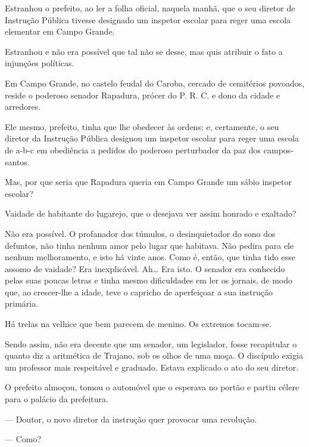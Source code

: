 
\noindent{}Estranhou o prefeito, ao ler a folha oficial, naquela manhã, que o seu
diretor de Instrução Pública tivesse designado um inspetor escolar para
reger uma escola elementar em Campo Grande.

Estranhou e não era possível que tal não se desse, mas quis atribuir o
fato a injunções políticas.

Em Campo Grande, no castelo feudal do Caroba, cercado de cemitérios
povoados, reside o poderoso senador Rapadura, prócer do P. R. C. e dono
da cidade e arredores.

Ele mesmo, prefeito, tinha que lhe obedecer às ordens; e, certamente, o
seu diretor da Instrução Pública designou um inspetor escolar para reger
uma escola de a-b-c em obediência a pedidos do poderoso perturbador da
paz dos campos-santos.

Mas, por que seria que Rapadura queria em Campo Grande um sábio inspetor
escolar?

Vaidade de habitante do lugarejo, que o desejava ver assim honrado e
exaltado?

Não era possível. O profanador dos túmulos, o desinquietador do sono dos
defuntos, não tinha nenhum amor pelo lugar que habitava. Não pedira para
ele nenhum melhoramento, e isto há vinte anos. Como é, então, que tinha
tido esse assomo de vaidade? Era inexplicável. Ah\ldots{} Era isto. O senador
era conhecido pelas suas poucas letras e tinha mesmo dificuldades em ler
os jornais, de modo que, ao crescer-lhe a idade, teve o capricho de
aperfeiçoar a sua instrução primária.

Há trelas na velhice que bem parecem de menino. Os extremos tocam-se.

Sendo assim, não era decente que um senador, um legislador, fosse
recapitular o quanto diz a aritmética de Trajano, sob os olhos de uma
moça. O discípulo exigia um professor mais respeitável e graduado.
Estava explicado o ato do seu diretor.

O prefeito almoçou, tomou o automóvel que o esperava no portão e partiu
célere para o palácio da prefeitura.


--- Doutor, o novo diretor da instrução quer provocar uma revolução.

--- Como?

